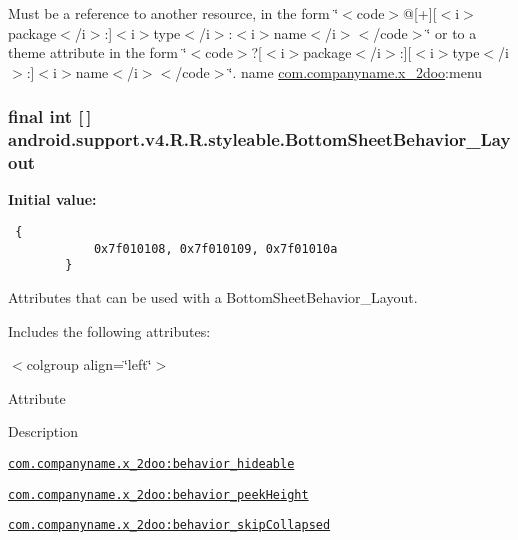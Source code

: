Must be a reference to another resource, in the form \char`\"{}$<$code$>$@\mbox{[}+\mbox{]}\mbox{[}$<$i$>$package$<$/i$>$:\mbox{]}$<$i$>$type$<$/i$>$:$<$i$>$name$<$/i$>$$<$/code$>$\char`\"{} or to a theme attribute in the form \char`\"{}$<$code$>$?\mbox{[}$<$i$>$package$<$/i$>$:\mbox{]}\mbox{[}$<$i$>$type$<$/i$>$:\mbox{]}$<$i$>$name$<$/i$>$$<$/code$>$\char`\"{}.  name \hyperlink{namespacecom_1_1companyname_1_1x__2doo}{com.companyname.x\_\-2doo}:menu \hypertarget{classandroid_1_1support_1_1v4_1_1_r_1_1styleable_d67360f84d04f5db038977a30714370e}{
\subsubsection[{BottomSheetBehavior\_\-Layout}]{\setlength{\rightskip}{0pt plus 5cm}final int \mbox{[}$\,$\mbox{]} android.support.v4.R.R.styleable.BottomSheetBehavior\_\-Layout}}
\label{classandroid_1_1support_1_1v4_1_1_r_1_1styleable_d67360f84d04f5db038977a30714370e}


\textbf{Initial value:}

\begin{Code}\begin{verbatim} {
            0x7f010108, 0x7f010109, 0x7f01010a
        }
\end{verbatim}
\end{Code}
Attributes that can be used with a BottomSheetBehavior\_\-Layout. 

Includes the following attributes: \begin{TabularC}{0}
\hline
\end{TabularC}
$<$colgroup align=\char`\"{}left\char`\"{}$>$ 

Attribute

Description 

{\tt \hyperlink{classandroid_1_1support_1_1v4_1_1_r_1_1styleable_aa3e1df0519e9c584de90cb3311b3ab9}{com.companyname.x\_\-2doo:behavior\_\-hideable}}

{\tt \hyperlink{classandroid_1_1support_1_1v4_1_1_r_1_1styleable_c5dfbc2d674faeb8b8e9c8aca7bace87}{com.companyname.x\_\-2doo:behavior\_\-peekHeight}}

{\tt \hyperlink{classandroid_1_1support_1_1v4_1_1_r_1_1styleable_5f8ab199874fa9fe7918ba54df0f40cc}{com.companyname.x\_\-2doo:behavior\_\-skipCollapsed}}

